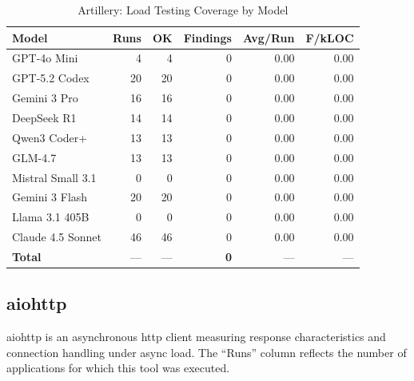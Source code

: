 \begin{table}[htbp]
    \centering
    \caption{Artillery: Load Testing Coverage by Model}
    \label{tab:tool_artillery}
    \small
    \begin{tabular}{@{} l r r r r r @{}}
        \toprule
        \textbf{Model} & \textbf{Runs} & \textbf{OK} & \textbf{Findings} & \textbf{Avg/Run} & \textbf{F/kLOC} \\
        \midrule
        GPT-4o Mini & 4 & 4 & 0 & 0.00 & 0.00 \\
        GPT-5.2 Codex & 20 & 20 & 0 & 0.00 & 0.00 \\
        Gemini 3 Pro & 16 & 16 & 0 & 0.00 & 0.00 \\
        DeepSeek R1 & 14 & 14 & 0 & 0.00 & 0.00 \\
        Qwen3 Coder+ & 13 & 13 & 0 & 0.00 & 0.00 \\
        GLM-4.7 & 13 & 13 & 0 & 0.00 & 0.00 \\
        Mistral Small 3.1 & 0 & 0 & 0 & 0.00 & 0.00 \\
        Gemini 3 Flash & 20 & 20 & 0 & 0.00 & 0.00 \\
        Llama 3.1 405B & 0 & 0 & 0 & 0.00 & 0.00 \\
        Claude 4.5 Sonnet & 46 & 46 & 0 & 0.00 & 0.00 \\
        \midrule
        \textbf{Total} & --- & --- & \textbf{0} & --- & --- \\
        \bottomrule
    \end{tabular}
\end{table}

\subsection{aiohttp}

aiohttp is an asynchronous http client measuring response characteristics and connection handling under async load. The ``Runs'' column reflects the number of applications for which this tool was executed.

